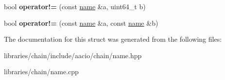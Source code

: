 \begin{DoxyCompactItemize}
\item 
\mbox{\label{structaacio_1_1chain_1_1name_ab3ec3b2b04671612ba911376023dba8d}} 
bool {\bfseries operator!=} (const \mbox{\hyperlink{structaacio_1_1chain_1_1name}{name}} \&a, uint64\+\_\+t b)
\item 
\mbox{\label{structaacio_1_1chain_1_1name_a5eaf933b75288a2dc3a5fd5399e26d7e}} 
bool {\bfseries operator!=} (const \mbox{\hyperlink{structaacio_1_1chain_1_1name}{name}} \&a, const \mbox{\hyperlink{structaacio_1_1chain_1_1name}{name}} \&b)
\end{DoxyCompactItemize}


The documentation for this struct was generated from the following files\+:\begin{DoxyCompactItemize}
\item 
libraries/chain/include/aacio/chain/name.\+hpp\item 
libraries/chain/name.\+cpp\end{DoxyCompactItemize}
